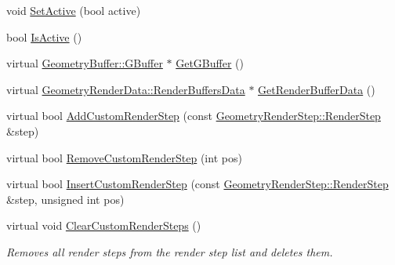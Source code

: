 \begin{DoxyCompactItemize}
void \mbox{\hyperlink{class_geometry_engine_1_1_geometry_world_item_1_1_geometry_camera_1_1_camera_a49c09449ffef91d95dea44061b3b4c21}{Set\+Active}} (bool active)
\item 
bool \mbox{\hyperlink{class_geometry_engine_1_1_geometry_world_item_1_1_geometry_camera_1_1_camera_a045debd24966944cf641dcf8f0366c77}{Is\+Active}} ()
\item 
virtual \mbox{\hyperlink{class_geometry_engine_1_1_geometry_buffer_1_1_g_buffer}{Geometry\+Buffer\+::\+G\+Buffer}} $\ast$ \mbox{\hyperlink{class_geometry_engine_1_1_geometry_world_item_1_1_geometry_camera_1_1_camera_a23673bed2b417962168e0bc5b8b37eb3}{Get\+G\+Buffer}} ()
\item 
virtual \mbox{\hyperlink{class_geometry_engine_1_1_geometry_render_data_1_1_render_buffers_data}{Geometry\+Render\+Data\+::\+Render\+Buffers\+Data}} $\ast$ \mbox{\hyperlink{class_geometry_engine_1_1_geometry_world_item_1_1_geometry_camera_1_1_camera_a467c210c6d8cb819537b6a058bed649b}{Get\+Render\+Buffer\+Data}} ()
\item 
virtual bool \mbox{\hyperlink{class_geometry_engine_1_1_geometry_world_item_1_1_geometry_camera_1_1_camera_a548c5c566cc732b7d0c00aca94cdcbbe}{Add\+Custom\+Render\+Step}} (const \mbox{\hyperlink{class_geometry_engine_1_1_geometry_render_step_1_1_render_step}{Geometry\+Render\+Step\+::\+Render\+Step}} \&step)
\item 
virtual bool \mbox{\hyperlink{class_geometry_engine_1_1_geometry_world_item_1_1_geometry_camera_1_1_camera_adb12d29b67837c4d5e5c94f6cb956bbd}{Remove\+Custom\+Render\+Step}} (int pos)
\item 
virtual bool \mbox{\hyperlink{class_geometry_engine_1_1_geometry_world_item_1_1_geometry_camera_1_1_camera_aff83b52805cc8085af8f0802ab554c11}{Insert\+Custom\+Render\+Step}} (const \mbox{\hyperlink{class_geometry_engine_1_1_geometry_render_step_1_1_render_step}{Geometry\+Render\+Step\+::\+Render\+Step}} \&step, unsigned int pos)
\item 
\mbox{\label{class_geometry_engine_1_1_geometry_world_item_1_1_geometry_camera_1_1_camera_a59c06151d81ffaa11cd725e17d27429e}} 
virtual void \mbox{\hyperlink{class_geometry_engine_1_1_geometry_world_item_1_1_geometry_camera_1_1_camera_a59c06151d81ffaa11cd725e17d27429e}{Clear\+Custom\+Render\+Steps}} ()
\begin{DoxyCompactList}\small\item\em Removes all render steps from the render step list and deletes them. \end{DoxyCompactList}\item 

\end{DoxyCompactItemize}
